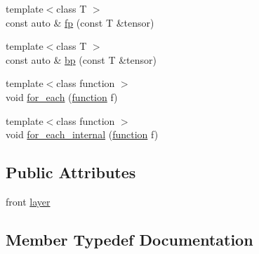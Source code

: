 \begin{DoxyCompactItemize}
\item 
{\footnotesize template$<$class T $>$ }\\const auto \& \hyperlink{structBC_1_1nn_1_1LayerChain_3_01index_00_01derived_00_01front_00_01lst_8_8_8_01_4_a51d89d7be3d8e2c80383755e4be87de9}{fp} (const T \&tensor)
\item 
{\footnotesize template$<$class T $>$ }\\const auto \& \hyperlink{structBC_1_1nn_1_1LayerChain_3_01index_00_01derived_00_01front_00_01lst_8_8_8_01_4_a2157a7b1de7de93f2599995bea600b5e}{bp} (const T \&tensor)
\item 
{\footnotesize template$<$class function $>$ }\\void \hyperlink{structBC_1_1nn_1_1LayerChain_3_01index_00_01derived_00_01front_00_01lst_8_8_8_01_4_ab4a52c92eff2ef04f4ba4b272aae406f}{for\+\_\+each} (\hyperlink{namespaceBC_1_1nn_a5429ceaa392776ade7234175af39050d}{function} f)
\item 
{\footnotesize template$<$class function $>$ }\\void \hyperlink{structBC_1_1nn_1_1LayerChain_3_01index_00_01derived_00_01front_00_01lst_8_8_8_01_4_a6d01b871e99c06808b1a9cb72c47719d}{for\+\_\+each\+\_\+internal} (\hyperlink{namespaceBC_1_1nn_a5429ceaa392776ade7234175af39050d}{function} f)
\end{DoxyCompactItemize}
\subsection*{Public Attributes}
\begin{DoxyCompactItemize}
\item 
front \hyperlink{structBC_1_1nn_1_1LayerChain_3_01index_00_01derived_00_01front_00_01lst_8_8_8_01_4_aa6b12c07d3bd41a770143aa4a4bb2bc5}{layer}
\end{DoxyCompactItemize}


\subsection{Member Typedef Documentation}
